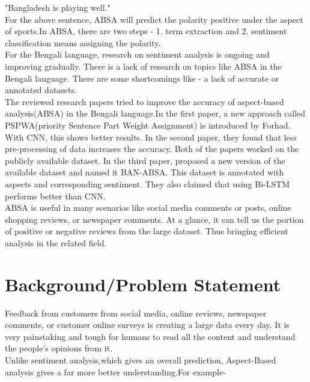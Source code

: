 \documentclass[a4paper,12pt]{article}
\begin{document}
 \noindent\hspace{4cm}"Bangladesh is playing well."\vspace{1em}\\
For the above sentence, ABSA will predict the polarity positive under the aspect of sports.In ABSA, there are two steps - 1. term extraction and 2. sentiment classification means assigning the polarity.\\[1\baselineskip]
For the Bengali language, research on sentiment analysis is ongoing and improving gradually. There is a lack of research on topics like ABSA in the Bengali language. There are some shortcomings like - a lack of accurate or annotated datasets.\vspace{1em}\\
The reviewed research papers tried to improve the accuracy of aspect-based analysis(ABSA) in the Bengali language.In the first paper, a new approach called PSPWA(priority Sentence Part Weight Assignment) is introduced by Forhad\cite{first}. With CNN, this shows better results. In the second paper, they found that less pre-processing of data increases the accuracy\cite{second}. Both of the papers worked on the publicly available dataset. In the third paper, proposed a new version of the available dataset and named it BAN-ABSA\cite{third}. This dataset is annotated with aspects and corresponding sentiment. They also claimed that using Bi-LSTM performs better than CNN.\\[1\baselineskip]
ABSA is useful in many scenarios like social media comments or posts, online shopping reviews, or newspaper comments. At a glance, it can tell us the portion of positive or negative reviews from the large dataset. Thus bringing efficient analysis in the related field.

\section{Background/Problem Statement}
Feedback from customers from social media, online reviews, newspaper comments, or customer online surveys is creating a large data every day. It is very painstaking and tough for humans to read all the content and understand the people's opinions from it.\\[1\baselineskip]
Unlike sentiment analysis,which gives an overall prediction, Aspect-Based analysis gives a far more better understanding.For example-{\vspace{1em}}
\end{document}
